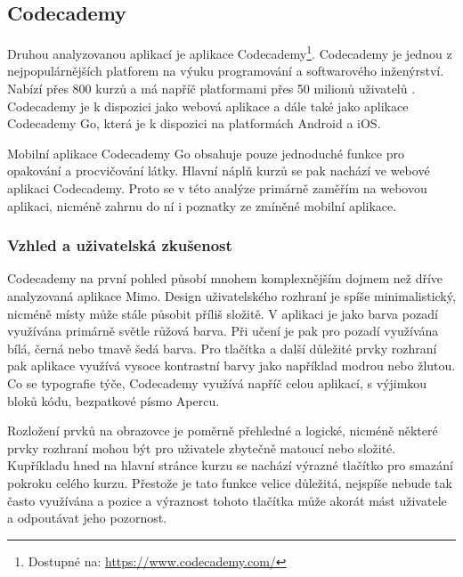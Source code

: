 \subsection{Codecademy}

Druhou analyzovanou aplikací je aplikace Codecademy\footnote{Dostupné na: \href{https://www.codecademy.com/}{https://www.codecademy.com/}}. Codecademy je jednou z nejpopulárnějších platforem na výuku programování a softwarového inženýrství. Nabízí přes 800 kurzů \cite{CodecademyCourses} a má napříč platformami přes 50 milionů uživatelů \cite{CodecademyPartnerships}. Codecademy je k dispozici jako webová aplikace a dále také jako aplikace Codecademy Go, která je k dispozici na platformách Android a iOS.

Mobilní aplikace Codecademy Go obsahuje pouze jednoduché funkce pro opakování a procvičování látky. Hlavní náplň kurzů se pak nachází ve webové aplikaci Codecademy. Proto se v této analýze primárně zaměřím na webovou aplikaci, nicméně zahrnu do ní i poznatky ze zmíněné mobilní aplikace.  

\subsubsection{Vzhled a uživatelská zkušenost}

Codecademy na první pohled působí mnohem komplexnějším dojmem než dříve analyzovaná aplikace Mimo. Design uživatelského rozhraní je spíše minimalistický, nicméně místy může stále působit příliš složitě. V aplikaci je jako barva pozadí využívána primárně světle růžová barva. Při učení je pak pro pozadí využívána bílá, černá nebo tmavě šedá barva. Pro tlačítka a další důležité prvky rozhraní pak aplikace využívá vysoce kontrastní barvy jako například modrou nebo žlutou. Co se typografie týče, Codecademy využívá napříč celou aplikací, s výjimkou bloků kódu, bezpatkové písmo Apercu.

Rozložení prvků na obrazovce je poměrně přehledné a logické, nicméně některé prvky rozhraní mohou být pro uživatele zbytečně matoucí nebo složité. Kupříkladu hned na hlavní stránce kurzu se nachází výrazné tlačítko pro smazání pokroku celého kurzu. Přestože je tato funkce velice důležitá, nejspíše nebude tak často využívána a pozice a výraznost tohoto tlačítka může akorát mást uživatele a odpoutávat jeho pozornost.

